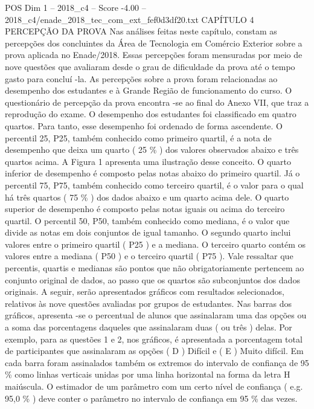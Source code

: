 \begin{textsample}{POS Dim 1 – 2018\_c4 – Score -4.00 – 2018\_c4/enade\_2018\_tec\_com\_ext\_fef0d3df20.txt}  \label{ex:f1_pos_309}
CAPÍTULO 4 PERCEPÇÃO DA PROVA Nas análises feitas neste capítulo, constam as percepções dos concluintes da Área de Tecnologia em Comércio Exterior sobre a prova aplicada no Enade/2018.
Essas percepções foram mensuradas por meio de nove questões que avaliaram desde o grau de dificuldade da prova até o tempo gasto para concluí -la.
As percepções sobre a prova foram relacionadas ao desempenho dos estudantes e à Grande Região de funcionamento do curso.
O questionário de percepção da prova encontra -se ao final do Anexo VII, que traz a reprodução do exame.
O desempenho dos estudantes foi classificado em quatro quartos.
Para tanto, esse desempenho foi ordenado de forma ascendente.
O percentil 25, P25, também conhecido como primeiro quartil, é a nota de desempenho que deixa um quarto ( 25 \% ) dos valores observados abaixo e três quartos acima.
A Figura 1 apresenta uma ilustração desse conceito.
O quarto inferior de desempenho é composto pelas notas abaixo do primeiro quartil.
Já o percentil 75, P75, também conhecido como terceiro quartil, é o valor para o qual há três quartos ( 75 \% ) dos dados abaixo e um quarto acima dele.
O quarto superior de desempenho é composto pelas notas iguais ou acima do terceiro quartil.
O percentil 50, P50, também conhecido como mediana, é o valor que divide as notas em dois conjuntos de igual tamanho.
O segundo quarto inclui valores entre o primeiro quartil ( P25 ) e a mediana.
O terceiro quarto contém os valores entre a mediana ( P50 ) e o terceiro quartil ( P75 ).
Vale ressaltar que percentis, quartis e medianas são pontos que não obrigatoriamente pertencem ao conjunto original de dados, ao passo que os quartos são subconjuntos dos dados originais.
A seguir, serão apresentados gráficos com resultados selecionados, relativos às nove questões avaliadas por grupos de estudantes.
Nas barras dos gráficos, apresenta -se o percentual de alunos que assinalaram uma das opções ou a soma das porcentagens daqueles que assinalaram duas ( ou três ) delas.
Por exemplo, para as questões 1 e 2, nos gráficos, é apresentada a porcentagem total de participantes que assinalaram as opções ( D ) Difícil e ( E ) Muito difícil.
Em cada barra foram assinalados também os extremos do intervalo de confiança de 95 \% como linhas verticais unidas por uma linha horizontal na forma da letra H maiúscula.
O estimador de um parâmetro com um certo nível de confiança ( e.g. 95,0 \% ) deve conter o parâmetro no intervalo de confiança em 95 \% das vezes.

\end{textsample}
